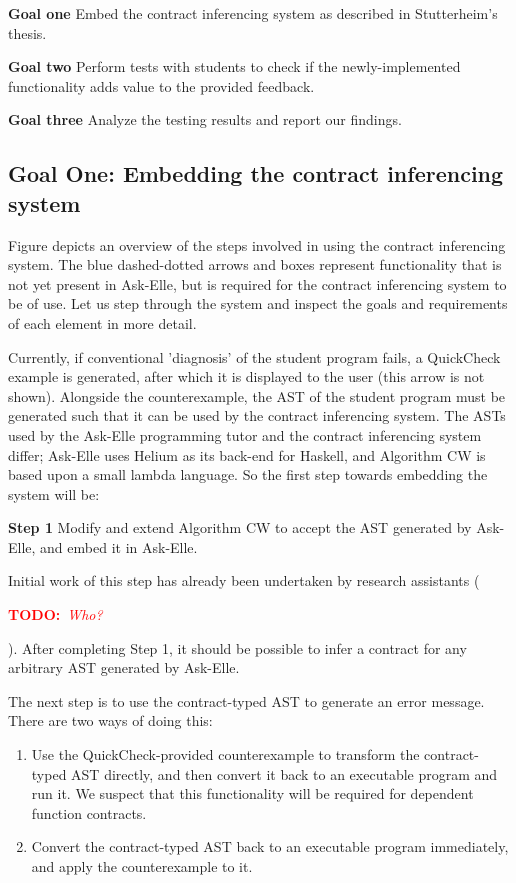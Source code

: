 \documentclass[10pt]{report}
\newcommand{\annotate}[3]{
	\begin{scriptsize}
	\textcolor{#1}{\textbf{#2}~\textit{#3}}
	\end{scriptsize}\newline}
\newcommand{\todo}[1]{\annotate{red} {TODO:} {#1}}
\begin{document}
\begin{description}
	\item{\textbf{Goal one}} Embed the contract inferencing system as described in Stutterheim's thesis.
	\item{\textbf{Goal two}} Perform tests with students to check if the newly-implemented functionality adds value to the provided feedback.
	\item{\textbf{Goal three}} Analyze the testing results and report our findings.
\end{description}

\subsection{Goal One: Embedding the contract inferencing system}


Figure depicts an overview of the steps involved in using the contract inferencing system.
The blue dashed-dotted arrows and boxes represent functionality that is not yet present in Ask-Elle, but is required for the contract inferencing system to be of use.
Let us step through the system and inspect the goals and requirements of each element in more detail.

Currently, if conventional 'diagnosis' of the student program fails, a QuickCheck example is generated, after which it is displayed to the user (this arrow is not shown).
Alongside the counterexample, the AST of the student program must be generated such that it can be used by the contract inferencing system.
The ASTs used by the Ask-Elle programming tutor and the contract inferencing system differ; Ask-Elle uses Helium as its back-end for Haskell, and Algorithm CW is based upon a small lambda language. So the first step towards embedding the system will be:

\begin{description}
	\item{\textbf{Step 1}} Modify and extend Algorithm CW to accept the AST generated by Ask-Elle, and embed it in Ask-Elle.
\end{description}

Initial work of this step has already been undertaken by research assistants (\todo{Who?}).
After completing Step 1, it should be possible to infer a contract for any arbitrary AST generated by Ask-Elle.

The next step is to use the contract-typed AST to generate an error message.
There are two ways of doing this:

\begin{enumerate}
	\item Use the QuickCheck-provided counterexample to transform the contract-typed AST directly, and then convert it back to an executable program and run it. We suspect that this functionality will be required for dependent function contracts.
	\item Convert the contract-typed AST back to an executable program immediately, and apply the counterexample to it.
\end{enumerate}
\end{document}
